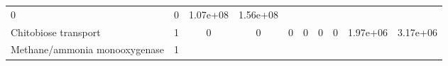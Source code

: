 \documentclass[]{article}
\begin{document}
\begin{longtable}[]{@{}lccccccccc@{}}
\begin{minipage}[t]{0.08\columnwidth}
0\strut
\end{minipage} & \begin{minipage}[t]{0.08\columnwidth}\centering\strut
0\strut
\end{minipage} & \begin{minipage}[t]{0.08\columnwidth}\centering\strut
1.07e+08\strut
\end{minipage} & \begin{minipage}[t]{0.08\columnwidth}\centering\strut
1.56e+08\strut
\end{minipage}\tabularnewline
\begin{minipage}[t]{0.07\columnwidth}\raggedright\strut
Chitobiose transport\strut
\end{minipage} & \begin{minipage}[t]{0.06\columnwidth}\centering\strut
1\strut
\end{minipage} & \begin{minipage}[t]{0.08\columnwidth}\centering\strut
0\strut
\end{minipage} & \begin{minipage}[t]{0.08\columnwidth}\centering\strut
0\strut
\end{minipage} & \begin{minipage}[t]{0.08\columnwidth}\centering\strut
0\strut
\end{minipage} & \begin{minipage}[t]{0.08\columnwidth}\centering\strut
0\strut
\end{minipage} & \begin{minipage}[t]{0.08\columnwidth}\centering\strut
0\strut
\end{minipage} & \begin{minipage}[t]{0.08\columnwidth}\centering\strut
0\strut
\end{minipage} & \begin{minipage}[t]{0.08\columnwidth}\centering\strut
1.97e+06\strut
\end{minipage} & \begin{minipage}[t]{0.08\columnwidth}\centering\strut
3.17e+06\strut
\end{minipage}\tabularnewline
\begin{minipage}[t]{0.07\columnwidth}\raggedright\strut
Methane/ammonia monooxygenase\strut
\end{minipage} & \begin{minipage}[t]{0.06\columnwidth}\centering\strut
1\strut
\end{minipage} & \begin{minipage}[t]{0.08\columnwidth}\centering\strut

\end{minipage}
\end{longtable}
\end{document}

